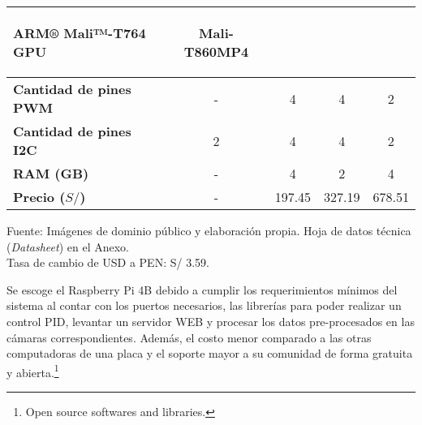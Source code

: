 \begin{savenotes}
\begin{mytable}[H]
\begin{tabular}{l|c|c|c|c|}
\begin{minipage}{\mythirdmaxsizeofcontenttable}
\begin{myflushcenterinsidetable}
					ARM® Mali™-T764 GPU
			\end{myflushcenterinsidetable}\end{minipage}
			&  		
			\begin{minipage}{\mythirdmaxsizeofcontenttable}\begin{myflushcenterinsidetable}
					Mali-T860MP4
			\end{myflushcenterinsidetable}\end{minipage} \\ \hline		
			\multicolumn{1}{|l|}{
				\begin{minipage}{\myforthmaxsizeofcontenttable}	
					\textbf{Cantidad de pines PWM}
				\end{minipage}
			} & - & 4 & 4 & 2 \\ \hline		
			\multicolumn{1}{|l|}{
				\begin{minipage}{\myforthmaxsizeofcontenttable}	
					\textbf{Cantidad de pines I2C}
				\end{minipage}
			} & 2 & 4 & 4 & 2 \\ \hline		
			\multicolumn{1}{|l|}{
				\begin{minipage}{\myforthmaxsizeofcontenttable}	
					\textbf{RAM (GB)}
				\end{minipage}
			} & - & 4 & 2 & 4 \\ \hline
			\multicolumn{1}{|l|}{
				\begin{minipage}{\myforthmaxsizeofcontenttable}	
					\textbf{Precio ($S/$)}
				\end{minipage}
			} & - & 197.45 & 327.19 & 678.51 \\ \hline		
		\end{tabular}
		\begin{myflushcenteraftertable}	
			Fuente: Imágenes de dominio público y elaboración propia. Hoja de datos técnica (\textit{Datasheet}) en el Anexo.\\
			Tasa de cambio de USD a PEN: S/ 3.59.
		\end{myflushcenteraftertable}
	\end{mytable}
\end{savenotes}

Se escoge el Raspberry Pi 4B debido a cumplir los requerimientos mínimos del sistema al contar con los puertos necesarios, las librerías para poder realizar un control PID, levantar un servidor WEB y procesar los datos pre-procesados en las cámaras correspondientes. Además, el costo menor comparado a las otras computadoras de una placa y el soporte mayor a su comunidad de forma gratuita y abierta.\footnote{Open source softwares and libraries.}

